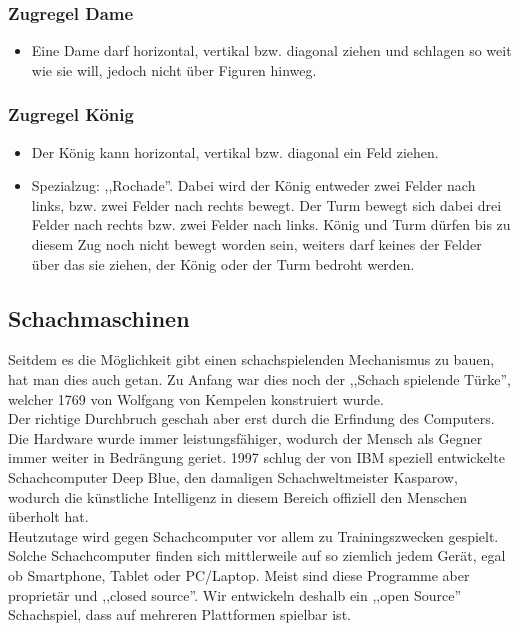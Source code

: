 \documentclass[12pt,a4paper]{article}
\begin{document}
{\subsubsection{Zugregel Dame}
\label{SUBSUBSEC:QUEEN}
\begin{itemize}
	\item{Eine Dame darf horizontal, vertikal bzw. diagonal ziehen und schlagen so weit wie sie will, jedoch nicht über Figuren hinweg.}
\end{itemize}

\subsubsection{Zugregel König}
\label{SUBSUBSEC:KING}
\begin{itemize}
	\item{Der König kann horizontal, vertikal bzw. diagonal ein Feld ziehen.}
	\item{Spezialzug: ,,Rochade''. Dabei wird der König entweder zwei Felder nach links, bzw. zwei Felder nach rechts bewegt. Der Turm bewegt sich dabei drei Felder nach rechts bzw. zwei Felder nach links. König und Turm dürfen bis zu diesem Zug noch nicht bewegt worden sein, weiters darf keines der Felder über das sie ziehen, der König oder der Turm bedroht werden.}
\end{itemize}



\subsection{Schachmaschinen}
\label{SUBSUBSEC:CHESS-COMPUTERS}

Seitdem es die Möglichkeit gibt einen schachspielenden Mechanismus zu bauen, hat man dies auch getan. Zu Anfang war dies noch der ,,Schach spielende Türke'', welcher 1769 von Wolfgang von Kempelen konstruiert wurde. \cite{wiki:chess} \\ 
Der richtige Durchbruch geschah aber erst durch die Erfindung des Computers. Die Hardware wurde immer leistungsfähiger, wodurch der Mensch als Gegner immer weiter in Bedrängung geriet. 1997 schlug der von IBM speziell entwickelte Schachcomputer Deep Blue, den damaligen Schachweltmeister Kasparow, wodurch die künstliche Intelligenz in diesem Bereich offiziell den Menschen überholt hat. \\
Heutzutage wird gegen Schachcomputer vor allem zu Trainingszwecken gespielt. Solche Schachcomputer finden sich mittlerweile auf so ziemlich jedem Gerät, egal ob Smartphone, Tablet oder PC/Laptop. Meist sind diese Programme aber proprietär und ,,closed source''. Wir entwickeln deshalb ein ,,open Source'' Schachspiel, dass auf mehreren Plattformen spielbar ist.
 
}
\end{document}
